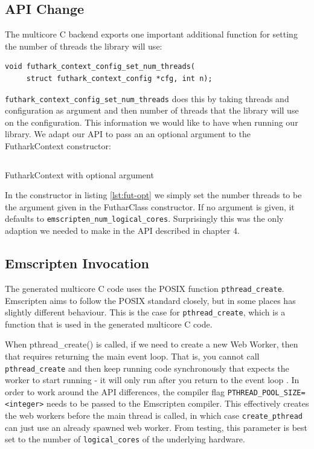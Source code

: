 \documentclass[11pt]{book}
\begin{document}
\subsection{API Change}
The multicore C backend exports one important additional function for setting the number of threads the library will use:
\begin{verbatim}
void futhark_context_config_set_num_threads(
     struct futhark_context_config *cfg, int n);
\end{verbatim}
\texttt{futhark\_context\_config\_set\_num\_threads} does this by taking threads and configuration as argument and then number of threads that the library will use on the configuration. This information we would like to have when running our library. We adapt our API to pass an an optional argument to the FutharkContext constructor:
\begin{listing}[H]
    \inputminted[fontsize=\small,baselinestretch=0.5,linenos]{JavaScript}{code/compiler/api_examples/FutharkContext-opt.js}
    \caption{FutharkContext with optional argument}    
    \label{lst:fut-opt}    
\end{listing} 
 
 In the constructor in listing \ref{lst:fut-opt} we simply set the number threads to be the argument given in the FutharClass constructor. If no argument is given, it defaults to \texttt{emscripten\_num\_logical\_cores}. Surprisingly this was the only adaption we needed to make in the API described in chapter 4.
\subsection{Emscripten Invocation}

The generated multicore C code uses the POSIX function \texttt{pthread\_create}. Emscripten aims to follow the POSIX standard closely, but in some places has slightly different behaviour. This is the case for \texttt{pthread\_create}, which is a function that is used in the generated multicore C code. 

When pthread\_create() is called, if we need to create a new Web Worker, then that requires returning the main event loop. That is, you cannot call \texttt{pthread\_create} and then keep running code synchronously that expects the worker to start running - it will only run after you return to the event loop \cite{pthread-doc}. In order to work around the API differences, the compiler flag \texttt{PTHREAD\_POOL\_SIZE=<integer>} needs to be passed to the Emscripten compiler. This effectively creates the web workers before the main thread is called, in which case \texttt{create\_pthread} can just use an already spawned web worker. From testing, this parameter is best set to the number of \texttt{logical\_cores} of the underlying hardware. %
\end{document}
